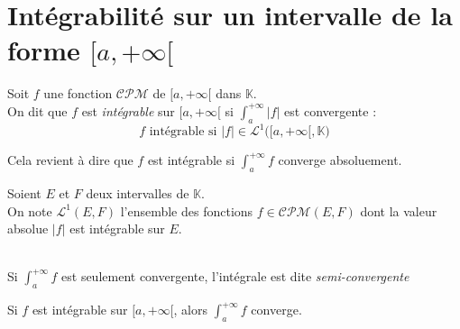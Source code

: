 \documentclass[11pt,a4paper,fleqn,pdftex]{report}
\begin{document}
\section{Intégrabilité sur un intervalle de la forme $[a,+\infty [$} %
\label{sec:integrabilite}
\begin{dfn}
    \label{dfn:integrable}
     Soit $f$ une fonction $\mathcal{CPM}$ de $[a,+\infty[$ dans $\mathbb{K}$.\\
     On dit que $f$ est \emph{intégrable} sur $[a,+\infty[$ si $\int_a^{+\infty} |f|$ est convergente : 
     \begin{equation}
     f\text{ intégrable si } |f|\in\mathcal{L}^1\bigg([a,+\infty[,\mathbb{K}\bigg)
     \end{equation}
\end{dfn}
Cela revient à dire que $f$ est intégrable si $\int_a^{+\infty} f$ converge absoluement. 
\begin{dfn}
     Soient $E$ et $F$ deux intervalles de $\mathbb{K}$.\\
     On note $\mathcal{L}^1(E,F)$ l'ensemble des fonctions $f \in \mathcal{CPM}(E,F)$ dont la valeur absolue $|f|$ est intégrable sur $E$.
\end{dfn}
\\
Si $\int_a^{+\infty} f$ est seulement convergente, l'intégrale est dite \emph{semi-convergente}
\begin{theorem}
     Si $f$ est intégrable sur $[a,+\infty[$, alors $\int_a^{+\infty} f$ converge.
\end{theorem}
\end{document}
